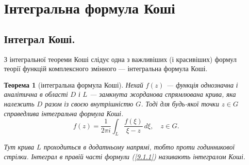 \documentclass[12pt,fleqn]{article}
\theoremstyle{theorem}
\newtheorem{thm}{Теорема}[section]
\theoremstyle{proof}
\numberwithin{figure}{section}
\numberwithin{equation}{section}
\begin{document}
\newpage

\section{Інтегральна формула Коші}\label{9}\allowdisplaybreaks

\subsection{Інтеграл Коші.}\label{9.1}
З інтегральної теореми Коші слідує одна з важливіших (і красивіших) формул теорії функцій комплексного змінного --- інтегральна формула Коші.
\begin{thm}[інтегральна формула Коші]
Нехай $f(z)$ --- функція однозначна і аналітична в області $D$ і $L$ --- замкнута жорданова спрямлювана крива, яка належить $D$ разом із своєю внутрішністю $G$. Тоді для будь-якої точки $z\in G$ справедлива інтегральна формула Коші.
\begin{equation}\label{9.1.1}
f(z)=\frac{1}{2\pi i}\int_{L}\frac{f(\xi)}{\xi - z}\,d\xi, \quad z\in G.
\end{equation}

Тут крива $L$ проходиться в додатньому напрямі, тобто проти годинникової стрілки. Інтеграл в правій часті формули (\ref{9.1.1}) називають інтегралом Коші.
\end{thm}
\end{document}
